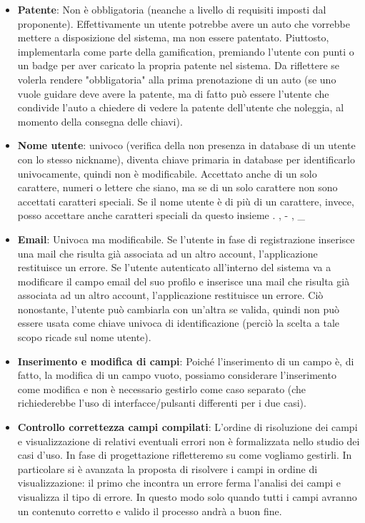 \documentclass[a4paper, 12pt]{article}
\begin{document}
\begin{itemize}
    \item \textbf{Patente}: Non è obbligatoria (neanche a livello di requisiti imposti dal proponente). Effettivamente un utente potrebbe avere un auto che vorrebbe mettere a disposizione del sistema, ma non essere patentato. Piuttosto, implementarla come parte della gamification, premiando l'utente con punti o un badge per aver caricato la propria patente nel sistema. Da riflettere se volerla rendere "obbligatoria" alla prima prenotazione di un auto (se uno vuole guidare deve avere la patente, ma di fatto può essere l'utente che condivide l'auto a chiedere di vedere la patente dell'utente che noleggia, al momento della consegna delle chiavi).
    \item \textbf{Nome utente}: univoco (verifica della non presenza in database di un utente con lo stesso nickname), diventa chiave primaria in database per identificarlo univocamente, quindi non è modificabile. Accettato anche di un solo carattere, numeri o lettere che siano, ma se di un solo carattere non sono accettati caratteri speciali. Se il nome utente è di più di un carattere, invece, posso accettare anche caratteri speciali da questo insieme { . , - , \_ } 
    \item \textbf{Email}: Univoca ma modificabile. Se l'utente in fase di registrazione inserisce una mail che risulta già associata ad un altro account, l'applicazione restituisce un errore. Se l'utente autenticato all'interno del sistema va a modificare il campo email del suo profilo e inserisce una mail che risulta già associata ad un altro account, l'applicazione restituisce un errore. Ciò nonostante, l'utente può cambiarla con un'altra se valida, quindi non può essere usata come chiave univoca di identificazione (perciò la scelta a tale scopo ricade sul nome utente).
    \item \textbf{Inserimento e modifica di campi}: Poiché l'inserimento di un campo è, di fatto, la modifica di un campo vuoto, possiamo considerare l'inserimento come modifica e non è necessario gestirlo come caso separato (che richiederebbe l'uso di interfacce/pulsanti differenti per i due casi).
    \item \textbf{Controllo correttezza campi compilati}: L'ordine di risoluzione dei campi e visualizzazione di relativi eventuali errori non è formalizzata nello studio dei casi d'uso. In fase di progettazione rifletteremo su come vogliamo gestirli. In particolare si è avanzata la proposta di risolvere i campi in ordine di visualizzazione: il primo che incontra un errore ferma l'analisi dei campi e visualizza il tipo di errore. In questo modo solo quando tutti i campi avranno un contenuto corretto e valido il processo andrà a buon fine.
\end{itemize}
\newpage
\end{document}
